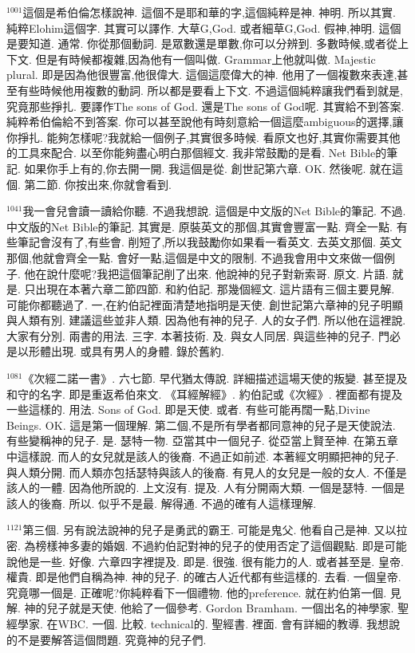 \documentclass{book}
\begin{document}
$^{1001}$這個是希伯倫怎樣說神.
這個不是耶和華的字,這個純粹是神.
神明.
所以其實.
純粹Elohim這個字.
其實可以譯作.
大草G,God.
或者細草G,God.
假神,神明.
這個是要知道.
通常.
你從那個動詞.
是眾數還是單數,你可以分辨到.
多數時候,或者從上下文.
但是有時候都複雜,因為他有一個叫做.
Grammar上他就叫做.
Majestic plural.
即是因為他很豐富,他很偉大.
這個這麼偉大的神.
他用了一個複數來表達,甚至有些時候他用複數的動詞.
所以都是要看上下文.
不過這個純粹讓我們看到就是,究竟那些掙扎.
要譯作The sons of God.
還是The sons of God呢.
其實給不到答案.
純粹希伯倫給不到答案.
你可以甚至說他有時刻意給一個這麼ambiguous的選擇,讓你掙扎.
能夠怎樣呢?我就給一個例子,其實很多時候.
看原文也好,其實你需要其他的工具來配合.
以至你能夠盡心明白那個經文.
我非常鼓勵的是看.
Net Bible的筆記.
如果你手上有的,你去開一開.
我這個是從.
創世記第六章.
OK.
然後呢.
就在這個.
第二節.
你按出來,你就會看到.

$^{1041}$我一會兒會讀一讀給你聽.
不過我想說.
這個是中文版的Net Bible的筆記.
不過.
中文版的Net Bible的筆記.
其實是.
原裝英文的那個,其實會豐富一點.
齊全一點.
有些筆記會沒有了,有些會.
削短了,所以我鼓勵你如果看一看英文.
去英文那個.
英文那個,他就會齊全一點.
會好一點,這個是中文的限制.
不過我會用中文來做一個例子.
他在說什麼呢?我把這個筆記削了出來.
他說神的兒子對新索哥.
原文.
片語.
就是.
只出現在本著六章二節四節.
和約伯記.
那幾個經文.
這片語有三個主要見解.
可能你都聽過了.
一,在約伯記裡面清楚地指明是天使.
創世記第六章神的兒子明顯與人類有別.
建議這些並非人類.
因為他有神的兒子.
人的女子們.
所以他在這裡說.
大家有分別.
兩書的用法.
三字.
本著技術.
及.
與女人同居.
與這些神的兒子.
門必是以形體出現.
或具有男人的身體.
錄於舊約.

$^{1081}$《次經二諾一書》.
六七節.
早代猶太傳說.
詳細描述這場天使的叛變.
甚至提及和守的名字.
即是重返希伯來文.
《耳經解經》.
約伯記或《次經》.
裡面都有提及一些這樣的.
用法.
Sons of God.
即是天使.
或者.
有些可能再闊一點,Divine Beings.
OK.
這是第一個理解.
第二個,不是所有學者都同意神的兒子是天使說法.
有些變稱神的兒子.
是.
瑟特一物.
亞當其中一個兒子.
從亞當上賢至神.
在第五章中這樣說.
而人的女兒就是該人的後裔.
不過正如前述.
本著經文明顯把神的兒子.
與人類分開.
而人類亦包括瑟特與該人的後裔.
有見人的女兒是一般的女人.
不僅是該人的一體.
因為他所說的.
上文沒有.
提及.
人有分開兩大類.
一個是瑟特.
一個是該人的後裔.
所以.
似乎不是最.
解得通.
不過的確有人這樣理解.

$^{1121}$第三個.
另有說法說神的兒子是勇武的霸王.
可能是鬼父.
他看自己是神.
又以拉密.
為榜樣神多妻的婚姻.
不過約伯記對神的兒子的使用否定了這個觀點.
即是可能說他是一些.
好像.
六章四字裡提及.
即是.
很強.
很有能力的人.
或者甚至是.
皇帝.
權貴.
即是他們自稱為神.
神的兒子.
的確古人近代都有些這樣的.
去看.
一個皇帝.
究竟哪一個是.
正確呢?你純粹看下一個禮物.
他的preference.
就在約伯第一個.
見解.
神的兒子就是天使.
他給了一個參考.
Gordon Bramham.
一個出名的神學家.
聖經學家.
在WBC.
一個.
比較.
technical的.
聖經書.
裡面.
會有詳細的教導.
我想說的不是要解答這個問題.
究竟神的兒子們.
\end{document}
